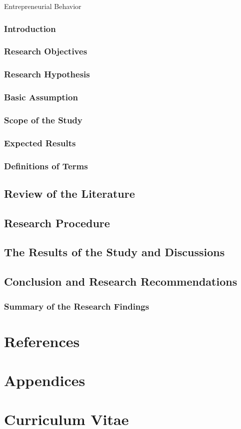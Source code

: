 \documentclass[12pt]{article}
\begin{document}
Entrepreneurial Behavior

\subsubsection{Introduction}

\subsubsection{Research Objectives}

\subsubsection{Research Hypothesis}
\subsubsection{Basic Assumption}
\subsubsection{Scope of the Study}
\subsubsection{Expected Results}
\subsubsection{Definitions of Terms}

\subsection{Review of the Literature}

\subsection{Research Procedure}

\subsection{The Results of the Study and Discussions}

\subsection{Conclusion and Research Recommendations}
\subsubsection{Summary of the Research Findings}

\section{References}

\section{Appendices}

\section{Curriculum Vitae}
\end{document}
